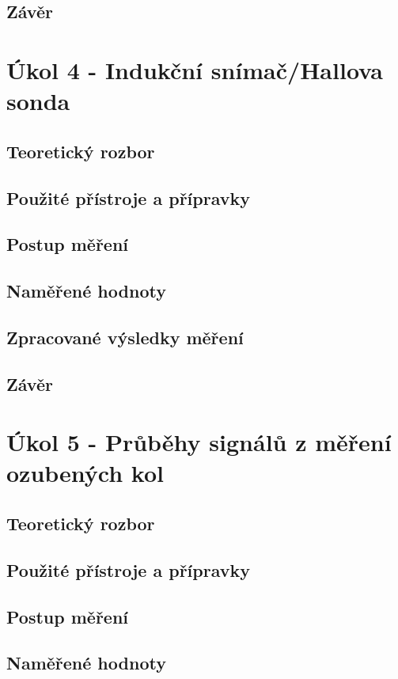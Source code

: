 \documentclass{protokol}
\begin{document}
    \subsection{Závěr}

\pagebreak

\section{Úkol 4 - Indukční snímač/Hallova sonda}
    \subsection{Teoretický rozbor}
    \subsection{Použité přístroje a přípravky}
    \subsection{Postup měření}
    \subsection{Naměřené hodnoty}
    \subsection{Zpracované výsledky měření}
    \subsection{Závěr}
\pagebreak

\section{Úkol 5 - Průběhy signálů z měření ozubených kol}
    \subsection{Teoretický rozbor}
    \subsection{Použité přístroje a přípravky}
    \subsection{Postup měření}
    \subsection{Naměřené hodnoty}
\end{document}

